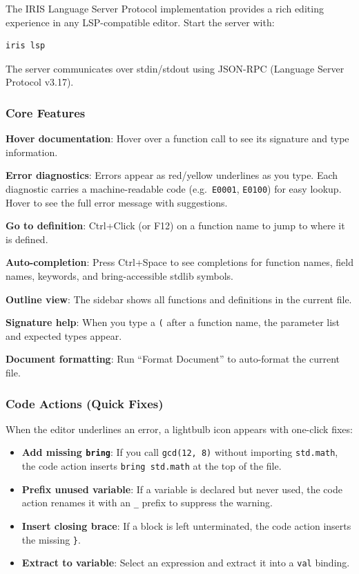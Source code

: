 \documentclass[
  english,
]{book}
\providecommand{\tightlist}{%
  \setlength{\itemsep}{0pt}\setlength{\parskip}{0pt}}
\begin{document}
The IRIS Language Server Protocol implementation provides a rich editing
experience in any LSP-compatible editor. Start the server with:

\begin{verbatim}
iris lsp
\end{verbatim}

The server communicates over stdin/stdout using JSON-RPC (Language
Server Protocol v3.17).

\subsubsection{Core Features}\label{core-features}

\textbf{Hover documentation}: Hover over a function call to see its
signature and type information.

\textbf{Error diagnostics}: Errors appear as red/yellow underlines as
you type. Each diagnostic carries a machine-readable code
(e.g.~\texttt{E0001}, \texttt{E0100}) for easy lookup. Hover to see the
full error message with suggestions.

\textbf{Go to definition}: Ctrl+Click (or F12) on a function name to
jump to where it is defined.

\textbf{Auto-completion}: Press Ctrl+Space to see completions for
function names, field names, keywords, and bring-accessible stdlib
symbols.

\textbf{Outline view}: The sidebar shows all functions and definitions
in the current file.

\textbf{Signature help}: When you type a \texttt{(} after a function
name, the parameter list and expected types appear.

\textbf{Document formatting}: Run ``Format Document'' to auto-format the
current file.

\subsubsection{Code Actions (Quick
Fixes)}\label{code-actions-quick-fixes}

When the editor underlines an error, a lightbulb icon appears with
one-click fixes:

\begin{itemize}
\tightlist
\item
  \textbf{Add missing \texttt{bring}}: If you call \texttt{gcd(12,\ 8)}
  without importing \texttt{std.math}, the code action inserts
  \texttt{bring\ std.math} at the top of the file.
\item
  \textbf{Prefix unused variable}: If a variable is declared but never
  used, the code action renames it with an \texttt{\_} prefix to
  suppress the warning.
\item
  \textbf{Insert closing brace}: If a block is left unterminated, the
  code action inserts the missing \texttt{\}}.
\item
  \textbf{Extract to variable}: Select an expression and extract it into
  a \texttt{val} binding.
\end{itemize}
\end{document}
